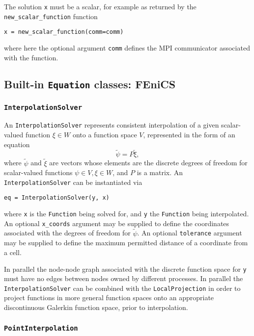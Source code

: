\documentclass[11pt]{article}
\begin{document}
The solution \texttt{x} must be a scalar, for example as returned by the
\texttt{new\_scalar\_function} function
\begin{lstlisting}
x = new_scalar_function(comm=comm)
\end{lstlisting}
where here the optional argument \texttt{comm} defines the MPI communicator
associated with the function.

\subsection{Built-in \texttt{Equation} classes: FEniCS}

\subsubsection{\texttt{InterpolationSolver}}\label{sect:InterpolationSolver}

An \texttt{InterpolationSolver} represents consistent interpolation of a given
scalar-valued function $\xi \in W$ onto a function space $V$, represented in
the form of an equation
\begin{equation*}
  \tilde{\psi} = P \tilde{\xi},
\end{equation*}
where $\tilde{\psi}$ and $\tilde{\xi}$ are vectors whose elements are the
discrete degrees of freedom for scalar-valued functions
$\psi \in V, \xi \in W$, and $P$ is a matrix. An \texttt{InterpolationSolver}
can be instantiated via
\begin{lstlisting}
eq = InterpolationSolver(y, x)
\end{lstlisting}
where \texttt{x} is the \texttt{Function} being solved for, and \texttt{y} the
\texttt{Function} being interpolated. An optional \texttt{x\_coords} argument
may be supplied to define the coordinates associated with the degrees of
freedom for $\tilde{\psi}$. An optional \texttt{tolerance} argument may be
supplied to define the maximum permitted distance of a coordinate from a cell.

In parallel the node-node graph associated with the discrete function space for
\texttt{y} must have no edges between nodes owned by different processes. In
parallel the \texttt{InterpolationSolver} can be combined with the
\texttt{LocalProjection} in order to project functions in more general function
spaces onto an appropriate discontinuous Galerkin function space, prior to
interpolation.

\subsubsection{\texttt{PointInterpolation}}
\end{document}

